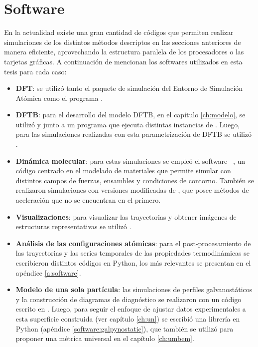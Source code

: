 \section{Software}

En la actualidad existe una gran cantidad de códigos que permiten realizar 
simulaciones de los distintos métodos descriptos en las secciones anteriores 
de manera eficiente, aprovechando la estructura paralela de los procesadores o 
las tarjetas gráficas. A continuación de mencionan los softwares utilizados 
en esta tesis para cada caso:
\begin{itemize}
    \item \textbf{DFT}: se utilizó tanto el paquete de simulación  
        \cite{enkovaara2010, mortensen2005} del Entorno de Simulación Atómica 
        \cite{larsen2017} como el programa   
        \cite{quantum_espresso, quantum_espresso_advanced}.
    \item \textbf{DFTB}: para el desarrollo del modelo DFTB, en el capítulo 
        \ref{ch:modelo}, se utilizó  \cite{hotcent} y
         \cite{tango} junto a un programa  que ejecuta
        distintas instancias de . Luego, para las simulaciones 
        realizadas con esta parametrización de DFTB se utilizó  
        \cite{dftb+}.
    \item \textbf{Dinámica molecular}: para estas simulaciones se empleó el 
        software  ~\cite{lammps1, lammps2}, un código centrado en 
        el modelado de materiales que permite simular con distintos campos de 
        fuerzas, ensambles y condiciones de contorno. También se realizaron 
        simulaciones con versiones modificadas de  \cite{gems}, que 
        posee métodos de aceleración que no se encuentran en el primero.
    \item \textbf{Visualizaciones}: para visualizar las trayectorias y obtener 
        imágenes de estructuras representativas se utilizó  \cite{vmd}.
    \item \textbf{Análisis de las configuraciones atómicas}: para el 
        post-procesamiento de las trayectorias y las series temporales de  las
        propiedades termodinámicas se escribieron distintos códigos en Python,
        los más relevantes se presentan en el apéndice \ref{a:software}.
    \item \textbf{Modelo de una sola partícula}: las simulaciones de perfiles 
        galvanostáticos y la construcción de diagramas de diagnóstico se 
        realizaron con un código escrito en . Luego, para seguir el 
        enfoque de ajustar datos experimentales a esta superficie construida 
        (ver capítulo \ref{ch:un}) se escribió una librería en Python 
        (apéndice \ref{software:galpynostatic}), que también se utilizó para 
        proponer una métrica universal en el capítulo \ref{ch:umbem}.
\end{itemize}

